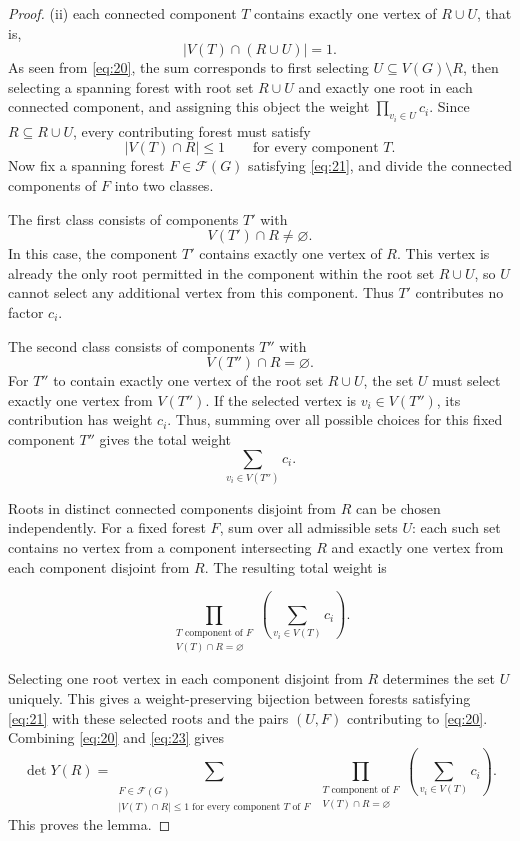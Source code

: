 \documentclass[11pt, a4paper]{article}
\theoremstyle{plain}
\begin{document}
\begin{proof}
(ii) each connected component $T$ contains exactly one vertex of $R\cup U$, that is,
\[
|V(T)\cap(R\cup U)|=1.
\]
As seen from \eqref{eq:20}, the sum corresponds to first selecting $U\subseteq V(G)\setminus R$,
then selecting a spanning forest with root set $R\cup U$ and exactly one root in each connected component,
and assigning this object the weight $\prod_{v_i\in U}c_i$.
Since $R\subseteq R\cup U$, every contributing forest must satisfy
\begin{equation}\label{eq:21}
|V(T)\cap R|\leq 1
\qquad
\text{for every component } T.
\end{equation}
Now fix a spanning forest $F\in \mathcal{F}(G)$ satisfying \eqref{eq:21},
and divide the connected components of $F$ into two classes.

The first class consists of components $T'$ with
\[
V(T')\cap R\neq\varnothing.
\]
In this case, the component $T'$ contains exactly one vertex of $R$.
This vertex is already the only root permitted in the component within the root set $R\cup U$,
so $U$ cannot select any additional vertex from this component. Thus $T'$ contributes no factor $c_i$.

The second class consists of components $T''$ with
\[
V(T'')\cap R=\varnothing.
\]
For $T''$ to contain exactly one vertex of the root set $R\cup U$,
the set $U$ must select exactly one vertex from $V(T'')$. If the selected vertex is
$v_i\in V(T'')$, its contribution has weight $c_i$.
Thus, summing over all possible choices for this fixed component $T''$ gives the total weight
\begin{equation}
\sum_{v_i\in V(T'')}c_i.
\end{equation}





Roots in distinct connected components disjoint from $R$ can be chosen independently.
For a fixed forest $F$, sum over all admissible sets $U$: each such set contains no vertex from a component intersecting $R$ and exactly one vertex from each component disjoint from $R$.
The resulting total weight is

\begin{equation}\label{eq:23}
\prod_{\substack{
T \text{ component of } F\\
V(T)\cap R=\varnothing
}}
\left(
\sum_{v_i\in V(T)}c_i
\right).
\end{equation}

Selecting one root vertex in each component disjoint from $R$ determines the set $U$ uniquely.
This gives a weight-preserving bijection between forests satisfying \eqref{eq:21} with these selected roots and the pairs $(U,F)$ contributing to \eqref{eq:20}.
Combining \eqref{eq:20} and \eqref{eq:23} gives
\[
\det Y(R)
=
\sum_{\substack{F\in\mathcal{F}(G)\\
|V(T)\cap R|\le 1 \text{ for every component } T \text{ of } F}}
\prod_{\substack{T \text{ component of } F\\
V(T)\cap R=\varnothing}}
\left(\sum_{v_i \in V(T)}c_i\right).
\]
This proves the lemma.
\end{proof}
\end{document}
